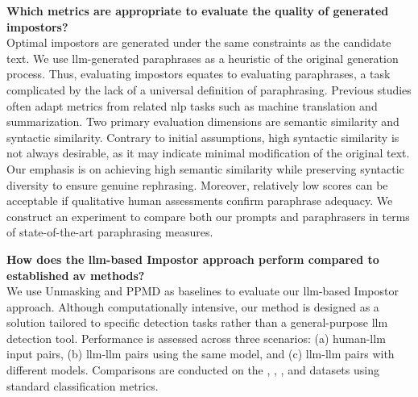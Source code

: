 \begin{questions}
    \item \textbf{Which metrics are appropriate to evaluate the quality of generated impostors?} \label{enum:rq2} \hfill \\
    Optimal impostors are generated under the same constraints as the candidate text.
    We use \ac{llm}-generated paraphrases as a heuristic of the original generation process.
    Thus, evaluating impostors equates to evaluating paraphrases, a task complicated by the lack of a universal definition of paraphrasing.
    Previous studies often adapt metrics from related \ac{nlp} tasks such as machine translation and summarization.
    Two primary evaluation dimensions are semantic similarity and syntactic similarity.
    Contrary to initial assumptions, high syntactic similarity is not always desirable, as it may indicate minimal modification of the original text.
    Our emphasis is on achieving high semantic similarity while preserving syntactic diversity to ensure genuine rephrasing.
    Moreover, relatively low scores can be acceptable if qualitative human assessments confirm paraphrase adequacy.
    We construct an experiment to compare both our prompts and paraphrasers in terms of state-of-the-art paraphrasing measures. 


    \item \textbf{How does the \ac{llm}-based Impostor approach perform compared to established \ac{av} methods?} \label{enum:rq3} \hfill \\
    We use Unmasking and PPMD as baselines to evaluate our \ac{llm}-based Impostor approach.
    Although computationally intensive, our method is designed as a solution tailored to specific detection tasks  rather than a general-purpose \ac{llm} detection tool.
    Performance is assessed across three scenarios: (a) human-\ac{llm} input pairs,
    (b) \ac{llm}-\ac{llm} pairs using the same model, and (c) \ac{llm}-\ac{llm} pairs with different models.
    Comparisons are conducted on the \dataStudent{}, \dataBlog{}, \dataGutenberg{}, and \dataPan{} datasets using standard classification metrics.
    
\end{questions}


